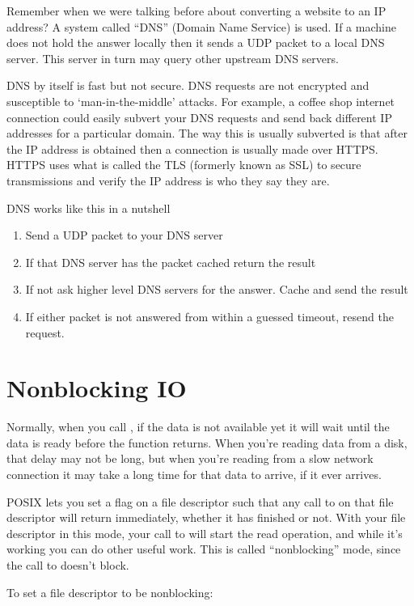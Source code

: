 Remember when we were talking before about converting a website to an IP address?
A system called ``DNS'' (Domain Name Service) is used.
If a machine does not hold the answer locally then it sends a UDP packet to a local DNS server.
This server in turn may query other upstream DNS servers.

DNS by itself is fast but not secure.
DNS requests are not encrypted and susceptible to `man-in-the-middle' attacks.
For example, a coffee shop internet connection could easily subvert your DNS requests and send back different IP addresses for a particular domain.
The way this is usually subverted is that after the IP address is obtained then a connection is usually made over HTTPS.
HTTPS uses what is called the TLS (formerly known as SSL) to secure transmissions and verify the IP address is who they say they are.

DNS works like this in a nutshell
\begin{enumerate}
  \tightlist
\item Send a UDP packet to your DNS server
\item If that DNS server has the packet cached return the result
\item If not ask higher level DNS servers for the answer. Cache and send the result
  \item If either packet is not answered from within a guessed timeout, resend the request.
\end{enumerate}

\section{Nonblocking IO}

Normally, when you call , if the data is not available yet it will wait until the data is ready before the function returns.
When you're reading data from a disk, that delay may not be long, but when you're reading from a slow network connection it may take a long time for that data to arrive, if it ever arrives.

POSIX lets you set a flag on a file descriptor such that any call to  on that file descriptor will return immediately, whether it has finished or not.
With your file descriptor in this mode, your call to  will start the read operation, and while it's working you can do other useful work.
This is called ``nonblocking'' mode, since the call to  doesn't block.

To set a file descriptor to be nonblocking:

